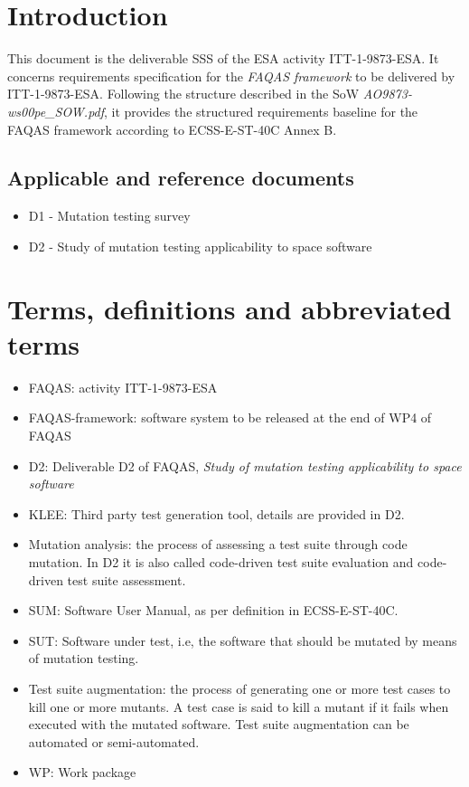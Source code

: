 
\chapter{Introduction}

This document is the deliverable SSS of the ESA activity ITT-1-9873-ESA. It concerns requirements specification for the \emph{FAQAS framework} to be delivered by ITT-1-9873-ESA. Following the structure described in the SoW \emph{AO9873-ws00pe\_SOW.pdf}, it provides the structured requirements baseline for the FAQAS framework according to ECSS-E-ST-40C Annex B.
 
\section{Applicable and reference documents}

\begin{itemize}
\item{D1 - Mutation testing survey}
\item{D2 - Study of mutation testing applicability to space software}
\end{itemize}

\chapter{Terms, definitions and abbreviated terms}

\begin{itemize}
\item{FAQAS}: activity ITT-1-9873-ESA
\item{FAQAS-framework}: software system to be released at the end of WP4 of FAQAS
\item{D2}: Deliverable D2 of FAQAS, \emph{Study of mutation testing applicability to space software}
\item{KLEE}: Third party test generation tool, details are provided in D2.
\item{Mutation analysis}: the process of assessing a test suite through code mutation. In D2 it is also called code-driven test suite evaluation and code-driven test suite assessment. 
\item{SUM}: Software User Manual, as per definition in ECSS-E-ST-40C.
\item{SUT}: Software under test, i.e, the software that should be mutated by means of mutation testing.
\item{Test suite augmentation}: the process of generating one or more test cases to kill one or more mutants. A test case is said to kill a mutant if it fails when executed with the mutated software. Test suite augmentation can be automated or semi-automated.
\item{WP}: Work package

\end{itemize}

\clearpage
 

